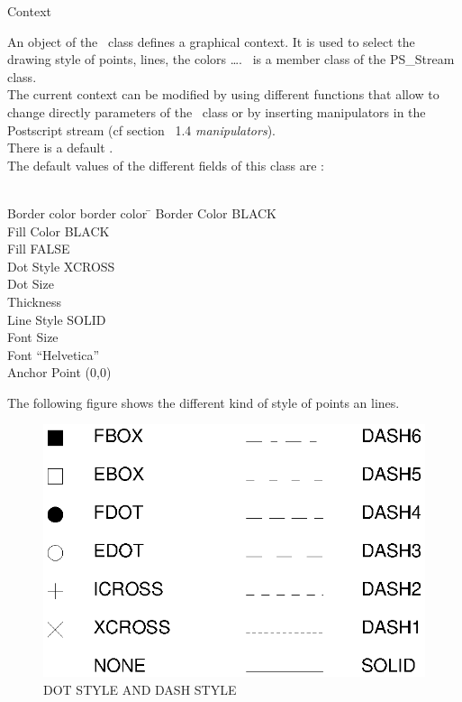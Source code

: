 \begin{ccClass} {Context}

\ccDefinition

An object of the \ccClassName\ class defines a graphical context. It is used 
to select the drawing style of points, lines, the colors \ldots.
\ccClassName\ is a member class of the PS\_Stream class.\\

The current context can be modified by using
different functions that allow to change directly parameters of the
\ccClassName\ class or by
inserting manipulators in the Postscript stream (cf section ~1.4 {\em manipulators}).\\ 

There is a default \ccClassName. \\
The default values of the different fields of this class are : \\
\\
\par
\begin{tabbing}
Border color border color \= \kill
Border Color     \>            BLACK\\
Fill Color       \>            BLACK\\
Fill             \>            FALSE\\
Dot Style        \>            XCROSS\\
Dot Size         \\
Thickness        \\
Line Style       \>            SOLID\\
Font Size        \\
Font             \>            ``Helvetica''\\
Anchor Point     \>            (0,0)\\
\end{tabbing}

The following figure shows the different kind of style of points an lines.

\begin{figure}[h]
\includegraphics{style.ps}
\caption{DOT STYLE AND DASH STYLE}
\end{figure}


\end{ccClass}
